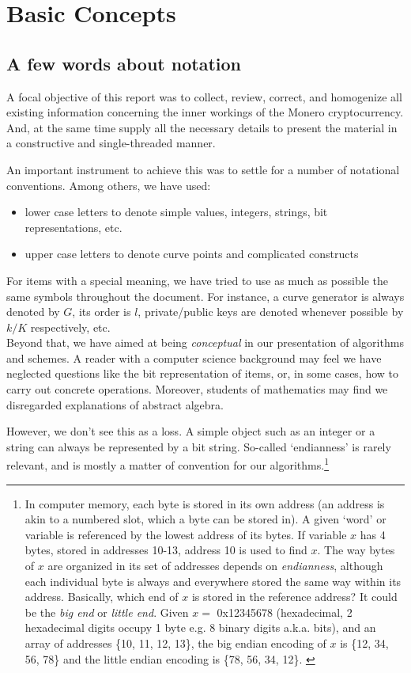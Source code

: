 \chapter{Basic Concepts}
\label{chapter:basicConcepts}



\section{A few words about notation}

A focal objective of this report was to collect, review, correct, and homogenize all existing information concerning the inner workings of the Monero cryptocurrency. And, at the same time supply all the necessary details to present the material in a constructive and single-threaded manner.

An important instrument to achieve this was to settle for a number of notational conventions. Among others, we have used:

\begin{itemize}
\item lower case letters to denote simple values, integers, strings, bit representations, etc.
\item upper case letters to denote curve points and complicated constructs
\end{itemize}

For items with a special meaning, we have tried to use as much as possible the same symbols throughout the document. For instance, a curve generator is always denoted by \(G\), its order is \(l\), private/public keys are denoted whenever possible by \(k/K\) respectively, etc.
\\

Beyond that, we have aimed at being {\em conceptual} in our presentation of algorithms and schemes. A reader with a computer science background may feel we have neglected questions like the bit representation of items, or, in some cases, how to carry out concrete operations. Moreover, students of mathematics may find we disregarded explanations of abstract algebra.

However, we don’t see this as a loss. A simple object such as an integer or a string can always be represented by a bit string. So-called `endianness' is rarely relevant, and is mostly a matter of convention for our algorithms.\footnote{In computer memory, each byte is stored in its own address (an address is akin to a numbered slot, which a byte can be stored in). A given `word' or variable is referenced by the lowest address of its bytes. If variable $x$ has 4 bytes, stored in addresses 10-13, address 10 is used to find $x$. The way bytes of $x$ are organized in its set of addresses depends on {\em endianness}, although each individual byte is always and everywhere stored the same way within its address. Basically, which end of $x$ is stored in the reference address? It could be the {\em big end} or {\em little end}. Given $x = $ 0x12345678 (hexadecimal, 2 hexadecimal digits occupy 1 byte e.g. 8 binary digits a.k.a. bits), and an array of addresses \{10, 11, 12, 13\}, the big endian encoding of $x$ is \{12, 34, 56, 78\} and the little endian encoding is \{78, 56, 34, 12\}. \cite{endianness}}

